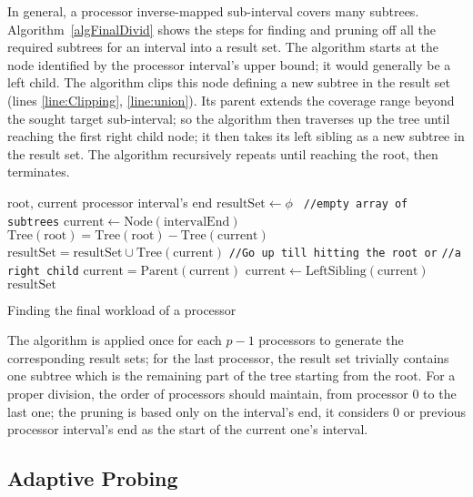 \documentclass[conference,compsoc]{IEEEtran}
\begin{document}
In general, a processor inverse-mapped sub-interval covers many subtrees. Algorithm~\ref{algFinalDivid} shows the steps for finding and pruning off all the required subtrees for an interval into a result set. The algorithm starts at the node identified by the processor interval's upper bound; it would generally be a left child. The algorithm clips this node defining a new subtree in the result set (lines \ref{line:Clipping}, \ref{line:union}). Its parent extends the coverage range beyond the sought target sub-interval; so the algorithm then traverses up the tree until reaching the first right child node; it then takes its left sibling as a new subtree in the result set. The algorithm recursively repeats until reaching the root, then terminates.

\begin{algorithm}
	\begin{algorithmic}[1]
		\REQUIRE $ \mathrm{root} $, current processor interval's end
		\STATE $\mathrm{resultSet} \gets \phi$ \texttt{	//empty array of subtrees}
		\STATE $ \mathrm{current} \gets \mathrm{Node(intervalEnd)} $
		\STATE $ \mathrm{Tree(root)} = \mathrm{Tree(root)} - \mathrm{Tree(current)} $ \label{line:Clipping}
		\STATE $ \mathrm{resultSet} = \mathrm{resultSet} \cup \mathrm{Tree(current)} $\label{line:union}
		\REPEAT
		\STATE \texttt{//Go up till hitting the root or}
		\STATE \texttt{//a right child}
		\STATE $ \mathrm{current} = \mathrm{Parent(current)} $
		\STATE $ \mathrm{current} \gets \mathrm{LeftSibling(current)} $
		\ENDIF
		\ENDWHILE
		\RETURN $ \mathrm{resultSet} $
	\end{algorithmic}
	\caption{Finding the final workload of a processor}
	\label{algFinalDivid}
\end{algorithm}
The algorithm is applied once for each $ p-1 $ processors to generate the corresponding result sets; for the last processor, the result set trivially contains one subtree which is the remaining part of the tree starting from the root. For a proper division, the order of processors should maintain, from processor $ 0 $ to the last one; the pruning is based only on the interval's end, it considers $ 0 $ or previous processor interval's end as the start of the current one's interval.

\subsection{Adaptive Probing}
\end{document}
